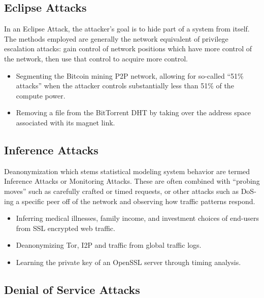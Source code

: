 \subsection{Eclipse Attacks}

In an Eclipse Attack, the attacker's goal is to hide part of a system from itself. The methods employed are generally the network equivalent of privilege escalation attacks: gain control of network positions which have more control of the network, then use that control to acquire more control.

\begin{itemize}
\item Segmenting the Bitcoin mining P2P network, allowing for so-called “51\% attacks” when the attacker controls substantially less than 51\% of the compute power\cite{bitcoinEclipse}.
\item Removing a file from the BitTorrent DHT by taking over the address space associated with its magnet link\cite{bittorrentSybilAttacks}.
\end{itemize}

\subsection{Inference Attacks}
\label{inference-attacks}

Deanonymization which stems statistical modeling system behavior are termed Inference Attacks or Monitoring Attacks. These are often combined with “probing moves” such as carefully crafted or timed requests, or other attacks such as DoS-ing a specific peer off of the network and observing how traffic patterns respond.

\begin{itemize}
\item Inferring medical illnesses, family income, and investment choices of end-users from SSL encrypted web traffic\cite{broadInferenceAttacks}.
\item Deanonymizing Tor, I2P and \Orchid{} traffic from global traffic logs\cite{mixTrafficAnalysis}.
\item Learning the private key of an OpenSSL server through timing analysis\cite{opensslTimingAttack}.
\end{itemize}

\subsection{Denial of Service Attacks}

